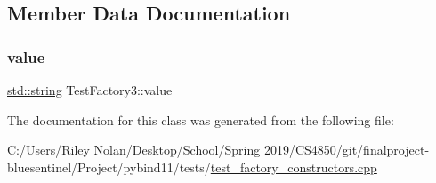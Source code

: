 \subsection{Member Data Documentation}
\mbox{\label{class_test_factory3_ae7cab154a489769687ea982c2962a074}} 
\subsubsection{\texorpdfstring{value}{value}}
{\footnotesize\ttfamily \mbox{\hyperlink{_s_d_l__opengl__glext_8h_ab4ccfaa8ab0e1afaae94dc96ef52dde1}{std\+::string}} Test\+Factory3\+::value}



The documentation for this class was generated from the following file\+:\begin{DoxyCompactItemize}
\item 
C\+:/\+Users/\+Riley Nolan/\+Desktop/\+School/\+Spring 2019/\+C\+S4850/git/finalproject-\/bluesentinel/\+Project/pybind11/tests/\mbox{\hyperlink{test__factory__constructors_8cpp}{test\+\_\+factory\+\_\+constructors.\+cpp}}\end{DoxyCompactItemize}
